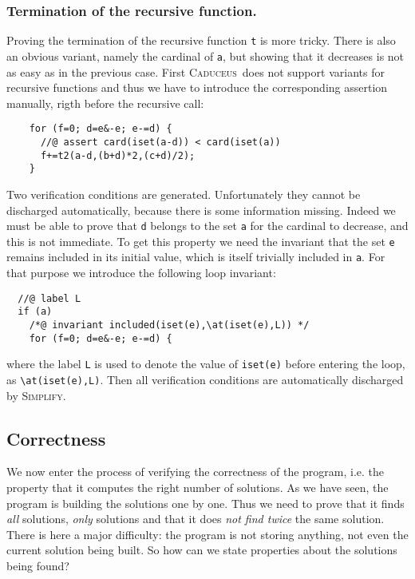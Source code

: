 \documentclass[a4paper]{llncs}
\newcommand{\caduceus}{\textsc{Caduceus}}
\newcommand{\simplify}{\textsc{Simplify}}
\begin{document}
\subsubsection{Termination of the recursive function.}
Proving the termination of the recursive function \texttt{t} is more
tricky. There is also an obvious variant, namely the cardinal of
\texttt{a}, but showing that it decreases is not as easy as in the
previous case. First \caduceus\ does not support variants for
recursive functions and thus we have to introduce the corresponding
assertion manually, rigth before the recursive call:
\begin{verbatim}
    for (f=0; d=e&-e; e-=d) {
      //@ assert card(iset(a-d)) < card(iset(a))
      f+=t2(a-d,(b+d)*2,(c+d)/2); 
    }
\end{verbatim}
Two verification conditions are generated. 
Unfortunately they cannot be discharged automatically, because there
is some information missing. Indeed we must be able to prove that
\texttt{d} belongs to the set \texttt{a} for the cardinal to decrease,
and this is not immediate. To get this property we need the invariant
that the set \texttt{e} remains included in its initial value, which
is itself trivially included in \texttt{a}. For that purpose we
introduce the following loop invariant:
\begin{verbatim}
  //@ label L
  if (a)
    /*@ invariant included(iset(e),\at(iset(e),L)) */
    for (f=0; d=e&-e; e-=d) {
\end{verbatim}
where the label \texttt{L} is used to denote the value of
\verb!iset(e)! before entering the loop, as \verb!\at(iset(e),L)!.
Then all verification conditions are automatically discharged by \simplify.

\subsection{Correctness}\label{correctness}

We now enter the process of verifying the correctness of the program,
i.e. the property that it computes the right number of solutions. As
we have seen, the program is building the solutions one by one. Thus
we need to prove that it finds \emph{all} solutions, \emph{only}
solutions and that it does \emph{not find twice} the same
solution. There is here a major difficulty: the program is not storing
anything, not even the current solution being built. So how can we
state properties about the solutions being found? 
\end{document}
